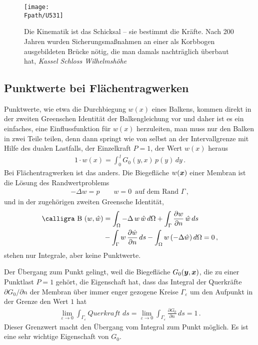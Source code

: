 \begin{figure}[tbp]
\centering
\if {} \sidecaption \fi
\texttt{[image: \\Fpath/U531]}
\caption{Die Kinematik \glq ist das Schicksal\grq{} -- sie bestimmt die Kr\"{a}fte. Nach 200 Jahren wurden Sicherungsma{\ss}nahmen an einer als Korbbogen ausgebildeten Br\"{u}cke n\"{o}tig, die man damals nachtr\"{a}glich \"{u}berbaut hat, {\em Kassel Schloss Wilhelmsh\"{o}he\/}} \label{U531}
\end{figure}
\vspace{-0.5cm}
{\textcolor{sectionTitleBlue}{\section{Punktwerte bei Fl\"{a}chentragwerken}}}
Punktwerte, wie etwa die Durchbiegung $w(x)$ eines Balkens, kommen direkt in der zweiten Greenschen Identit\"{a}t der Balkengleichung vor und daher ist es ein einfaches, eine Einflussfunktion f\"{u}r $w(x)$ herzuleiten, man muss nur den Balken in zwei Teile teilen, denn dann springt wie von selbst an der Intervallgrenze mit Hilfe des dualen Lastfalls, der Einzelkraft $P = 1$, der Wert $w(x)$ heraus
\begin{align}
1 \cdot w(x) = \int_0^{\,l} G_0(y,x)\,p(y)\,dy\,.
\end{align}
Bei Fl\"{a}chentragwerken ist das anders. Die Biegefl\"{a}che $w(\mbox{\boldmath $x$})$ einer Membran ist die L\"{o}sung des Randwertproblems
\begin{align}
- \Delta w = p \qquad  w = 0 \,\,\,\text{auf dem Rand $\Gamma$}\,,
\end{align}
und in der zugeh\"{o}rigen zweiten Greensche Identit\"{a}t,
\begin{align}
\text{\normalfont\calligra B\,\,}(w,\hat{w}) &= \int_{\Omega} - \Delta\,w\,\hat{w}\,d\Omega + \int_{\Gamma} \frac{\partial w}{\partial n}\,\hat{w}\,ds \nn \\
&- \int_{\Gamma} w\,\frac{\partial \hat{w}}{\partial n}\,ds - \int_{\Omega} w\,(- \Delta \hat{w})\,d\Omega = 0\,,
\end{align}
stehen nur Integrale, aber keine Punktwerte.

Der \"{U}bergang zum Punkt gelingt, weil die Biegefl\"{a}che $G_0(\mbox{\boldmath $y$},\mbox{\boldmath $x$})$, die zu einer Punktlast $P = 1$ geh\"{o}rt, die Eigenschaft hat, dass das Integral der Querkr\"{a}fte $\partial G_0/\partial n$ der Membran \"{u}ber immer enger gezogene Kreise $\Gamma_\varepsilon$ um den Aufpunkt in der Grenze den Wert $1$ hat
\begin{align}\label{Eq88}
\lim_{\varepsilon \to 0} \int_{\Gamma_\varepsilon} Querkraft\,\,ds = \lim_{\varepsilon \to 0} \int_{\Gamma_\varepsilon} \frac{\partial G_0}{\partial n}\,ds = 1\,.
\end{align}
Dieser Grenzwert macht den \"{U}bergang vom Integral zum Punkt m\"{o}glich. Es ist eine sehr wichtige Eigenschaft von $G_0$.

